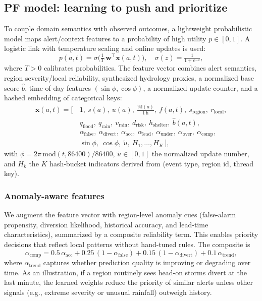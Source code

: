 \subsection{PF model: learning to push and prioritize}
\label{sec:pf-model}
To couple domain semantics with observed outcomes, a lightweight probabilistic model maps alert/context features to a probability of high utility $p \in [0,1]$. A logistic link with temperature scaling and online updates is used:
$$
p(a,t) = \sigma\big(\tfrac{1}{T}\,\mathbf{w}^\top \mathbf{x}(a,t)\big),\quad
\sigma(z) = \tfrac{1}{1+e^{-z}},
$$
where $T{>}0$ calibrates probabilities. The feature vector combines alert semantics, region severity/local reliability, synthesized hydrology proxies, a normalized base score $\hat{b}$, time-of-day features $(\sin\phi,\cos\phi)$, a normalized update counter, and a hashed embedding of categorical keys:
\begin{align*}
\mathbf{x}(a,t) = [\,&1,\ s(a),\ u(a),\ \tfrac{\mathrm{ttl}(a)}{1\,\mathrm{h}},\ f(a,t),\ s_{\text{region}},\ r_{\text{local}},\\
& q_{\text{flood}},\ q_{\text{rain}},\ v_{\text{rain}},\ d_{\text{risk}},\ h_{\text{shelter}},\ \hat{b}(a,t),\\
& \alpha_{\text{false}},\ \alpha_{\text{divert}},\ \alpha_{\text{acc}},\ \alpha_{\text{lead}},\ \alpha_{\text{under}},\ \alpha_{\text{over}},\ \alpha_{\text{comp}},\\
& \sin\phi,\ \cos\phi,\ \tilde{u},\ H_1,\ldots,H_K\,],
\end{align*}
with $\phi = 2\pi\,\mathrm{mod}(t,86400)/86400$, $\tilde{u}\in[0,1]$ the normalized update number, and $H_k$ the $K$ hash-bucket indicators derived from (event type, region id, thread key).

\subsubsection{Anomaly-aware features}
We augment the feature vector with region-level anomaly cues (false-alarm propensity, diversion likelihood, historical accuracy, and lead-time characteristics), summarized by a composite reliability term. This enables priority decisions that reflect local patterns without hand-tuned rules. The composite is
$$
\alpha_{\text{comp}} = 0.5\,\alpha_{\text{acc}} + 0.25\,(1-\alpha_{\text{false}}) + 0.15\,(1-\alpha_{\text{divert}}) + 0.1\,\alpha_{\text{trend}},
$$
where $\alpha_{\text{trend}}$ captures whether prediction quality is improving or degrading over time. As an illustration, if a region routinely sees head-on storms divert at the last minute, the learned weights reduce the priority of similar alerts unless other signals (e.g., extreme severity or unusual rainfall) outweigh history.

